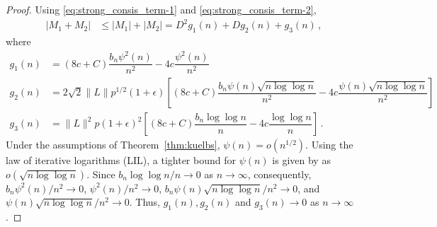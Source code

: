 \documentclass[11pt]{article}
\newtheorem{lemma}{Lemma}
\theoremstyle{remark}
\begin{document}
\begin{proof}
%
Using \eqref{eq:strong_consis_term-1} and \eqref{eq:strong_consis_term-2},
\begin{align*}
|M_1 + M_2|  & \leq |M_1| + |M_2|
   = D^2g_1(n) + D g_2(n) + g_3(n)\,,
\end{align*}
where
\begin{align*}
    g_1(n) &= (8c + C)\dfrac{b_n \psi^2(n)}{n^2} - 4c\dfrac{\psi^2(n)}{n^2}\\
    g_2(n) &= 2\sqrt{2}\|L\|p^{1/2}(1+\epsilon)\left[(8c + C)\dfrac{b_n\psi(n)\sqrt{n\log \log n}}{n^2} - 4c\dfrac{\psi(n)\sqrt{n\log \log n}}{n^2}\right]\\
    g_3(n) &= \|L\|^2 p (1+\epsilon)^2\left[(8c + C)\dfrac{b_n \log\log n}{n} - 4c \dfrac{\log \log n}{n}\right]\,.
\end{align*}
Under the assumptions of Theorem~\ref{thm:kuelbs}, $\psi(n) = o(n^{1/2})$. Using the law of iterative logarithms (LIL), a tighter bound for $\psi(n)$ is given by \cite{stra:1964} as $o(\sqrt{n\log \log n})$. Since $b_n \log \log n / n \to 0$ as $n \to \infty$, consequently, 
$b_n \psi^2(n)/n^2 \to 0$, $\psi^2(n)/n^2 \to 0$, ${b_n\psi(n)\sqrt{n\log \log n}/n^2} \to 0$, and $\psi(n) \sqrt{n \log \log n}/n^2 \to 0$. Thus, $g_1(n), g_2(n)$ and $g_3(n) \to 0$ as $n \to \infty$.
\end{proof}
%
\end{document}
